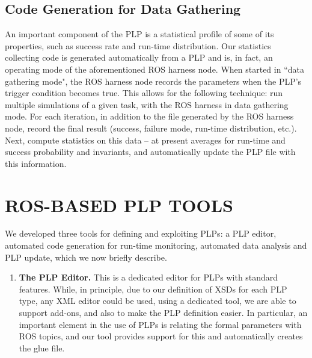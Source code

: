 \documentclass[letterpaper]{article}
\begin{document}
{%


\subsection{Code Generation for Data Gathering}
An important component of the PLP is a statistical profile of some of its properties, such as success rate and run-time distribution.
 Our statistics collecting code is generated automatically from a PLP and is, in fact,
an operating mode of the aforementioned ROS harness node. When started in ``data gathering mode", the ROS harness node records the parameters when the PLP's trigger condition becomes true. This allows for the following technique: run multiple simulations of a given task, with the ROS harness in data gathering mode. For each iteration, in addition to the file generated by the ROS harness node, record the final result (success, failure mode, run-time distribution, etc.). Next, compute statistics on this data -- at present averages for run-time and success probability and invariants, and automatically update the PLP file with this information.


\section{ROS-BASED PLP TOOLS}
We developed three tools for defining and exploiting PLPs: 
a PLP editor, automated code generation for run-time monitoring,
automated data analysis and PLP update, which we now briefly describe.
\begin{enumerate}
\item {\bf The PLP Editor.}
This is a dedicated editor for PLPs with standard features. While, in principle, due to our definition of XSDs for each PLP type, any XML editor could be used, using a dedicated tool, we are able to support  add-ons, and also to make the PLP definition easier. In particular, an important element in the use of PLPs is relating the formal parameters with ROS topics, and our tool provides support for this and automatically creates the glue file.


\end{enumerate}}
\end{document}
